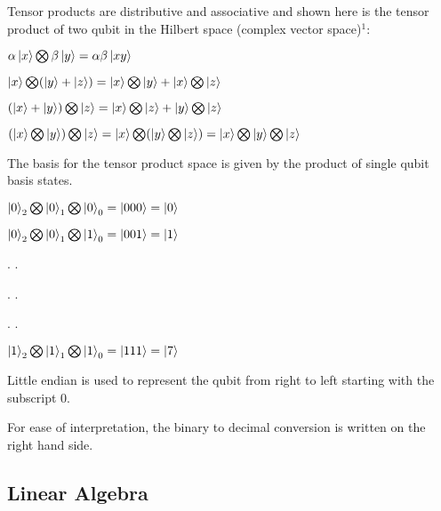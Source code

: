 \documentclass{article}
\begin{document}
\noindent
Tensor products are distributive and associative and shown here is the tensor product of two qubit in the Hilbert space (complex vector space)\hyperlink{1}{$^1$}:
\vspace{5mm}


\qquad $\alpha\ket{x} \bigotimes \beta\ket{y} = \alpha\beta\ket{xy}$
\vspace{5mm}


\qquad $\ket{x} \bigotimes (\ket{y} + \ket{z}) = \ket{x}\bigotimes \ket{y} + \ket{x}\bigotimes\ket{z}$
\vspace{5mm}


\qquad $(\ket{x} + \ket{y}) \bigotimes \ket{z} = \ket{x}\bigotimes \ket{z} + \ket{y}\bigotimes\ket{z}$
\vspace{5mm}


\qquad $(\ket{x} \bigotimes \ket{y}) \bigotimes \ket{z} = \ket{x} \bigotimes (\ket{y} \bigotimes\ket{z}) = \ket{x} \bigotimes \ket{y} \bigotimes\ket{z}$
\vspace{10mm}

The basis for the tensor product space is given by the product of single qubit basis states.
\vspace{5mm}

\qquad $\ket{0}_2 \bigotimes \ket{0}_1 \bigotimes \ket{0}_0 = \ket{000} = \ket{0}$
\vspace{5mm}

\qquad $\ket{0}_2 \bigotimes \ket{0}_1 \bigotimes \ket{1}_0 = \ket{001} = \ket{1}$
\vspace{5mm}

\qquad \qquad \qquad . \qquad \qquad .

\qquad \qquad \qquad . \qquad \qquad .

\qquad \qquad \qquad . \qquad \qquad .

\qquad $\ket{1}_2 \bigotimes \ket{1}_1 \bigotimes \ket{1}_0 = \ket{111} = \ket{7}$
\vspace{5mm}

Little endian is used to represent the qubit from right to left starting with the subscript 0.

For ease of interpretation, the binary to decimal conversion is written on the right hand side. 
\pagebreak





\subsection{Linear Algebra}
\vspace{5mm}
\end{document}
